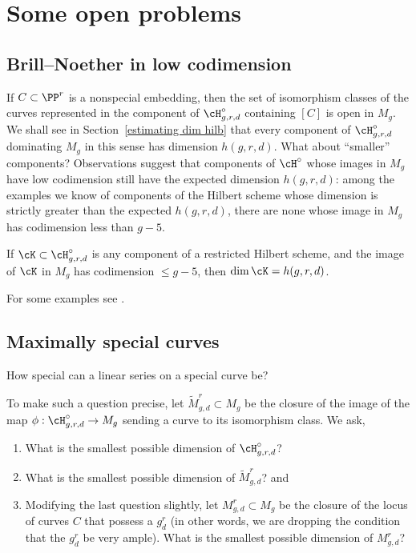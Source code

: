 \section{Some open problems}\label{open problems}

\subsection*{Brill--Noether in low codimension}

If $C\subset \PP^r$ is a nonspecial embedding, then the set of isomorphism
classes of the curves represented
in the component of $\cH^\circ_{g,r,d}$ containing $[C]$ is open in
$M_g$. We shall see in Section~\ref{estimating dim hilb} that every
component of $\cH^\circ_{g,r,d}$  dominating $M_g$ in this sense has
dimension $h(g,r,d)$.
%
What about ``smaller'' components?
Observations suggest that components of $\cH^\circ$ whose images in
$M_g$ have low codimension still have the expected dimension $h(g,r,d)$:
among the examples we know of components of the Hilbert scheme whose
dimension is strictly greater than the expected $h(g,r,d)$, there are
none whose image in $M_g$ has codimension less than $g-5$.

\begin{conjecture}\label{large rho hilb dimension}
If $\cK \subset \cH^\circ_{g,r,d}$ is any component of a restricted
Hilbert scheme, and the image of $\cK$ in $M_g$ has codimension $\leq
g-5$, then $\dim \cK = h(g,r,d)$.
\end{conjecture}

For some examples see \cite[Theorem 3.4]{MR1221726}.


\subsection*{Maximally special  curves}
How special can a linear series on a special curve be?

To make such a question precise, let $\widetilde M^r_{g,d} \subset M_g$
%
be the closure of the image of the map $\phi : \cH^\circ_{g,r,d}\to M_g$
sending a curve to its isomorphism class. We ask,
\begin{enumerate}
\item What is the smallest possible dimension of $\cH^\circ_{g,r,d}$?
\item What is the smallest possible dimension of $\widetilde
M^r_{g,d}$? and
\item Modifying the last question slightly, let $M^r_{g,d} \subset
M_g$ be the closure of the locus of curves $C$ that possess a $g^r_d$
(in other words, we are dropping the condition that the $g^r_d$ be very
ample). What is the smallest possible dimension of $M^r_{g,d}$?
\end{enumerate}

